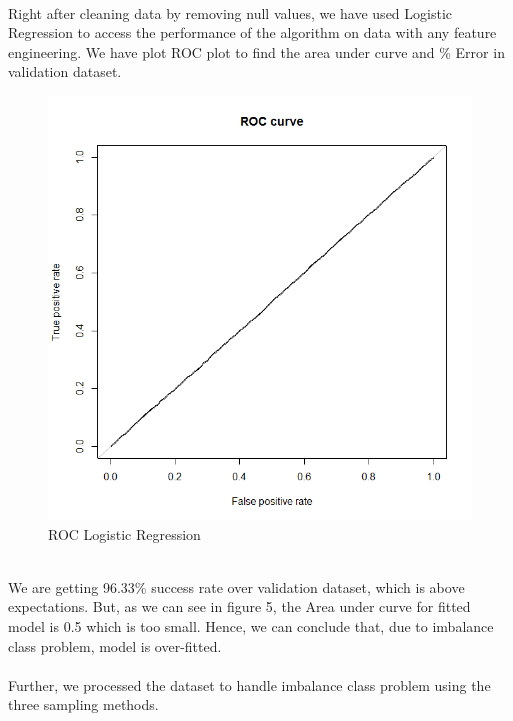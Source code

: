 \documentclass[fleqn,10pt]{SelfArx} %
\begin{document}
\paragraph{}
Right after cleaning data by removing null values, we have used Logistic Regression to access the performance of the algorithm on data with any feature engineering. We have plot ROC plot to find the area under curve and \% Error in validation dataset.\\
    \begin{figure}[h]
	\includegraphics[width=0.8\columnwidth]{plots/ROC_logistic.png}\centering
	\caption{ROC Logistic Regression}
	\end{figure}\\
	
	We are getting 96.33\% success rate over validation dataset, which is above expectations. But, as we can see in figure 5, the Area under curve for fitted model is 0.5 which is too small. Hence, we can conclude that, due to imbalance class problem, model is over-fitted.\\
	\paragraph{}
	Further, we processed the dataset to handle imbalance class problem using the three sampling methods.
	
\end{document}
